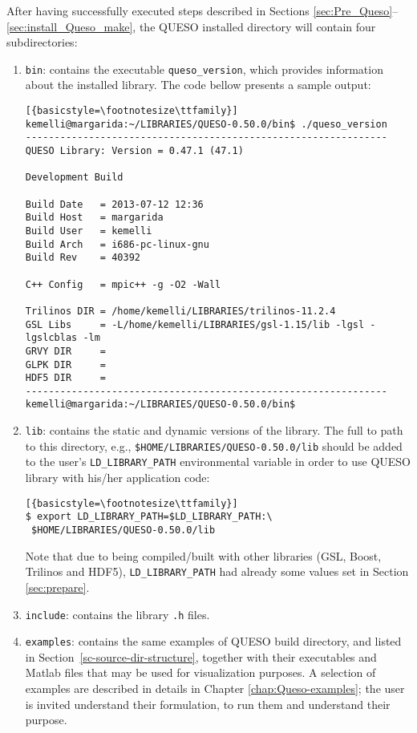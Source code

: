 After having successfully executed steps described in Sections \ref{sec:Pre_Queso}--\ref{sec:install_Queso_make}, the QUESO installed directory will contain four subdirectories:
\begin{enumerate}
 \item \verb+bin+: contains the executable \verb+queso_version+, which provides information about the installed library. The code bellow presents a sample output:

\begin{lstlisting}[{basicstyle=\footnotesize\ttfamily}]
kemelli@margarida:~/LIBRARIES/QUESO-0.50.0/bin$ ./queso_version 
---------------------------------------------------------------
QUESO Library: Version = 0.47.1 (47.1)

Development Build

Build Date   = 2013-07-12 12:36
Build Host   = margarida
Build User   = kemelli
Build Arch   = i686-pc-linux-gnu
Build Rev    = 40392

C++ Config   = mpic++ -g -O2 -Wall

Trilinos DIR = /home/kemelli/LIBRARIES/trilinos-11.2.4
GSL Libs     = -L/home/kemelli/LIBRARIES/gsl-1.15/lib -lgsl -lgslcblas -lm
GRVY DIR     = 
GLPK DIR     = 
HDF5 DIR     = 
---------------------------------------------------------------
kemelli@margarida:~/LIBRARIES/QUESO-0.50.0/bin$ 
\end{lstlisting}

 \item \verb+lib+: contains the static and dynamic versions of the library. The full to path to this directory, e.g., \verb+$HOME/LIBRARIES/QUESO-0.50.0/lib+ should be added to the user's \verb+LD_LIBRARY_PATH+ environmental variable in order to use QUESO library with his/her application code:
\begin{lstlisting}[{basicstyle=\footnotesize\ttfamily}]
$ export LD_LIBRARY_PATH=$LD_LIBRARY_PATH:\
 $HOME/LIBRARIES/QUESO-0.50.0/lib
\end{lstlisting}


Note that due to \Queso{} being compiled/built with other libraries (GSL, Boost, Trilinos and HDF5), \verb+LD_LIBRARY_PATH+ had already some values set in Section \ref{sec:prepare}.


 \item \verb+include+: contains the library \verb+.h+ files.

 \item \verb+examples+: contains the same examples of QUESO build directory, and listed in Section~\ref{sc-source-dir-structure}, together with their executables and Matlab files that may be used for visualization purposes. A selection of examples are described in details in Chapter \ref{chap:Queso-examples}; the user is invited understand their formulation, to run them and understand their purpose. 


\end{enumerate}




